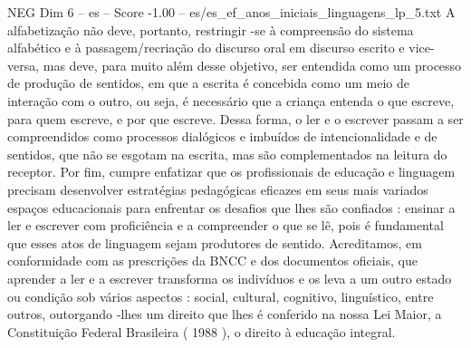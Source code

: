 \begin{textsample}{NEG Dim 6 – es – Score -1.00 – es/es\_ef\_anos\_iniciais\_linguagens\_lp\_5.txt}
A alfabetização não deve, portanto, restringir -se à compreensão do sistema alfabético e à passagem/recriação do discurso oral em discurso escrito e vice-versa, mas deve, para muito além desse objetivo, ser entendida como um processo de produção de sentidos, em que a escrita é concebida como um meio de interação com o outro, ou seja, é necessário que a criança entenda o que escreve, para quem escreve, e por que escreve.
Dessa forma, o ler e o escrever passam a ser compreendidos como processos dialógicos e imbuídos de intencionalidade e de sentidos, que não se esgotam na escrita, mas são complementados na leitura do receptor.
Por fim, cumpre enfatizar que os profissionais de educação e linguagem precisam desenvolver estratégias pedagógicas eficazes em seus mais variados espaços educacionais para enfrentar os desafios que lhes são confiados : ensinar a ler e escrever com proficiência e a compreender o que se lê, pois é fundamental que esses atos de linguagem sejam produtores de sentido.
Acreditamos, em conformidade com as prescrições da BNCC e dos documentos oficiais, que aprender a ler e a escrever transforma os indivíduos e os leva a um outro estado ou condição sob vários aspectos : social, cultural, cognitivo, linguístico, entre outros, outorgando -lhes um direito que lhes é conferido na nossa Lei Maior, a Constituição Federal Brasileira ( 1988 ), o direito à educação integral.

\end{textsample}
